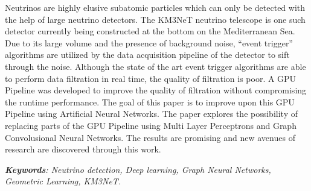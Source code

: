 


\begin{abstracts}        %


  Neutrinos are highly elusive subatomic particles which can only be
  detected with the help of large neutrino detectors. The KM3NeT
  neutrino telescope is one such detector currently being constructed
  at the bottom on the Mediterranean Sea. Due to its large volume and
  the presence of background noise, ``event trigger'' algorithms are
  utilized by the data acquisition pipeline of the detector to sift
  through the noise. Although the state of the art event trigger
  algorithms are able to perform data filtration in real time, the
  quality of filtration is poor. A GPU Pipeline was developed to
  improve the quality of filtration without compromising the runtime
  performance. The goal of this paper is to improve upon this GPU
  Pipeline using Artificial Neural Networks. The paper explores the
  possibility of replacing parts of the GPU Pipeline using Multi Layer
  Perceptrons and Graph Convolusional Neural Networks. The results are
  promising and new avenues of research are discovered through this
  work.

  \emph{\textbf{Keywords}: Neutrino detection, Deep learning, Graph
  Neural Networks, Geometric Learning, KM3NeT.}
\end{abstracts}


